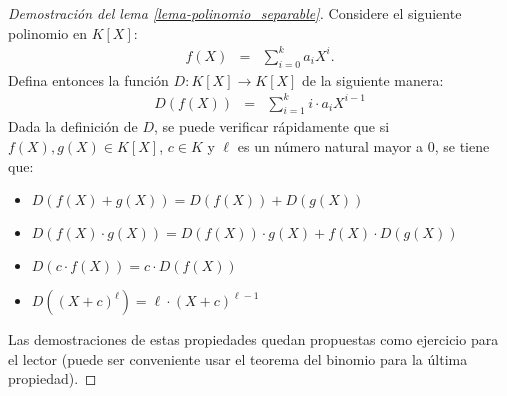 \begin{proof}[Demostración del lema \ref{lema-polinomio_separable}]
  Considere el siguiente polinomio en $K[X]$:
  \begin{eqnarray*}
    f(X) & = & \sum_{i=0}^{k} a_iX^i.
  \end{eqnarray*}
  Defina entonces la función
  $D:K[X] \to K[X]$ de la siguiente manera:
\begin{eqnarray*}
	D(f(X)) &=& \sum_{i=1}^{k}i\cdot a_i X^{i-1}
\end{eqnarray*}
Dada la definición de $D$, se puede verificar rápidamente que si $f(X),g(X)\in K[X]$, $c\in K$ y $\ell$ es un número natural mayor a 0, se tiene que:
\begin{itemize}
	\item $D(f(X)+g(X)) = D(f(X)) + D(g(X))$
	\item $D(f(X) \cdot g(X)) = D(f(X)) \cdot g(X) + f(X) \cdot D(g(X))$
	\item $D(c\cdot f(X)) = c\cdot D(f(X))$
	\item $D((X+c)^{\ell}) = \ell\cdot(X+c)^{\ell -1}$
\end{itemize}
Las demostraciones de estas propiedades quedan propuestas como
ejercicio para el lector (puede ser conveniente usar el teorema del
binomio para la última propiedad).


\end{proof}
